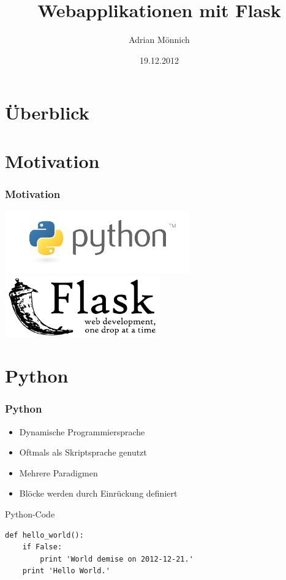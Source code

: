 \documentclass{beamer}
\date{19.12.2012}
\title{Webapplikationen mit Flask}
\author{Adrian Mönnich}
\institute[Hochschule Karlsruhe]{
  Fakultät für Informatik und Wirtschaftsinformatik\\
  Hochschule Karlsruhe
}
\begin{document}
\maketitle
\section*{Überblick}
\frame{\tableofcontents}


\section{Motivation}
\begin{frame}
  \frametitle{Motivation}
  \includegraphics[width=0.6\textwidth]{images/python-logo.png} \hspace*{\fill}
  \newline
  \hspace*{\fill} \includegraphics[width=0.5\textwidth]{images/flask-logo.pdf}
\end{frame}


\section{Python}
\begin{frame}[fragile]
  \frametitle{Python}
  \begin{itemize}
    \item Dynamische Programmiersprache
    \item Oftmals als Skriptsprache genutzt
    \item Mehrere Paradigmen
    \item Blöcke werden durch Einrückung definiert
  \end{itemize}

  \begin{exampleblock}{Python-Code}
    \begin{lstlisting}
def hello_world():
    if False:
        print 'World demise on 2012-12-21.'
    print 'Hello World.'
    \end{lstlisting}
  \end{exampleblock}
\end{frame}
\end{document}
